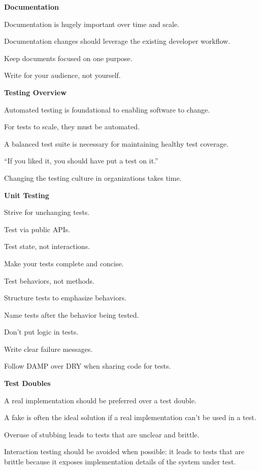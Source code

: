\item \textbf{Documentation}
\bit
\item Documentation is hugely important over time and scale.
\item Documentation changes should leverage the existing developer workflow.
\item Keep documents focused on one purpose.
\item Write for your audience, not yourself.
\eit

\item \textbf{Testing Overview}
\bit
\item Automated testing is foundational to enabling software to change.
\item For tests to scale, they must be automated.
\item A balanced test suite is necessary for maintaining healthy test coverage.
\item ``If you liked it, you should have put a test on it.''
\item Changing the testing culture in organizations takes time.
\eit


\item \textbf{Unit Testing}
\bit
\item Strive for unchanging tests.
\item Test via public APIs.
\item Test state, not interactions.
\item Make your tests complete and concise.
\item Test behaviors, not methods.
\item Structure tests to emphasize behaviors.
\item Name tests after the behavior being tested.
\item Don't put logic in tests.
\item Write clear failure messages.
\item Follow DAMP over DRY when sharing code for tests.
\eit

\item \textbf{Test Doubles}
\bit
\item A real implementation should be preferred over a test double.
\item A fake is often the ideal solution if a real implementation can't be used in a test.
\item Overuse of stubbing leads to tests that are unclear and brittle.
\item Interaction testing should be avoided when possible: it leads to tests that are brittle because it exposes
implementation details of the system under test.
\eit

